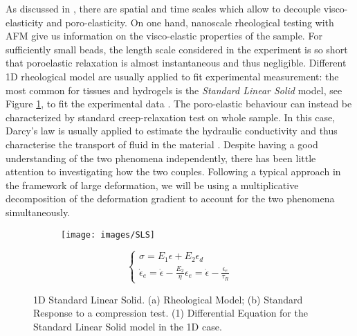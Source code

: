 As discussed in \cite{viscoporo}, there are spatial and time scales which allow to decouple visco-elasticity and poro-elasticity. On one hand, nanoscale rheological testing with AFM give us information on the visco-elastic properties of the sample. For sufficiently small beads, the length scale considered in the experiment is so short that poroelastic relaxation is almost instantaneous and thus negligible. Different 1D rheological model are usually applied to fit experimental measurement: the most common for tissues and hydrogels is the \textit{Standard Linear Solid} model, see Figure \ref{SLS}, to fit the experimental data \cite{Article1,viscoporo}. The poro-elastic behaviour can instead be characterized by standard creep-relaxation test on whole sample. In this case, Darcy's law is usually applied to estimate the hydraulic conductivity and thus characterise the transport of fluid in the material \cite{Netti,viscoporo}. Despite having a good understanding of the two phenomena independently, there has been little attention to investigating how the two couples. Following a typical approach in the framework of large deformation, we will be using a multiplicative decomposition of the deformation gradient to account for the two phenomena simultaneously. 

\begin{figure}
	\begin{subfigure}{0.45\textwidth}
		\centering 
		\def\svgwidth{1.3\linewidth}
		
		\caption{}
	\end{subfigure}
	\begin{subfigure}{0.45\textwidth}
	\centering
	\texttt{[image: images/SLS]}\qquad 
	\caption{}
	\end{subfigure}

\vspace{5mm}
\begin{equation}
\begin{cases}
\sigma = E_1\epsilon+E_2\epsilon_d\\
\dot{\epsilon}_e = \dot{\epsilon} -\frac{E_2}{\eta} \epsilon_e = \dot{\epsilon} - \frac{\epsilon_e}{\tau_R}
\end{cases}
\tag{SLS}
\end{equation}
\vspace{3mm}
\caption{1D Standard Linear Solid. (a) Rheological Model; (b) Standard Response to a compression test. (1) Differential Equation for the Standard Linear Solid model in the 1D case.}
\label{SLS}
\end{figure}

